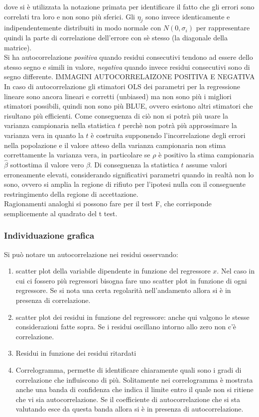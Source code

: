 dove si è utilizzata la notazione primata per identificare il fatto che gli errori sono correlati tra loro e non sono più sferici. Gli $\eta_j$ sono invece identicamente e indipendentemente distribuiti in modo normale con $N(0,\sigma_i)$ per rappresentare quindi la parte di correlazione dell'errore con sè stesso (la diagonale della matrice).\\
Si ha autocorrelazione \textit{positiva} quando residui consecutivi tendono ad essere dello stesso segno e simili in valore, \textit{negativa} quando invece residui consecutivi sono di segno differente.
IMMAGINI AUTOCORRELAIZONE POSITIVA E NEGATIVA
In caso di autocorrelazione gli stimatori OLS  dei parametri per la regressione lineare sono ancora lineari e corretti (unbiased) ma non sono più i migliori stimatori possibili, quindi non sono più BLUE, ovvero esistono altri stimatori che risultano più efficienti. Come conseguenza di ciò non si potrà più usare la varianza campionaria nella statistica $t$ perchè non potrà più approssimare la varianza vera in quanto la $t$ è costruita supponendo l'incorrelazione degli errori nella popolazione e il valore atteso della varianza campionaria non stima correttamente la varianza vera, in particolare se $\rho$ è positivo la stima campionaria $\hat{\beta}$ sottostima il valore vero $\beta$. Di conseguenza la statistica $t$ assume valori erroneamente elevati, considerando significativi parametri quando in realtà non lo sono, ovvero si amplia la regione di rifiuto per l'ipotesi nulla con il conseguente restringimento della regione di accettazione. \\
Ragionamenti analoghi si possono fare per il test F, che corrisponde semplicemente al quadrato del t test.
\subsubsection{Individuazione grafica}
Si può notare un autocorrelazione nei residui osservando:
\begin{enumerate}
	\item scatter plot della variabile dipendente in funzione  del regressore $x$. Nel caso in cui ci fossero più regressori bisogna fare uno scatter plot in funzione di ogni regressore. Se si nota una certa regolarità nell'andamento allora si è in presenza di correlazione.
	\item scatter plot dei residui in funzione del regressore: anche qui valgono le stesse considerazioni fatte sopra. Se i residui oscillano intorno allo zero non c'è correlazione.
	\item Residui in funzione dei residui ritardati
	\item Correlogramma, permette di identificare chiaramente quali sono i gradi di correlazione che influiscono di più. Solitamente nei correlogramma è mostrata anche una banda di confidenza che indica il limite entro il quale non si ritiene che vi sia autocorrelazione. Se il coefficiente di autocorrelazione che si sta valutando esce da questa banda allora si è in presenza di autocorrelazione.
\end{enumerate}
